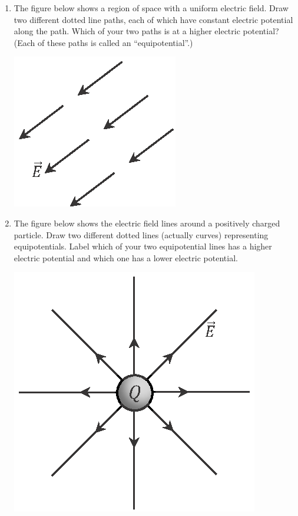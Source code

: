 \begin{enumerate}[wide, label=(\emph{\alph*})]
\item The figure below shows a region of space with a uniform electric field.  Draw two different dotted line paths, each of which have constant electric potential along the path.  Which of your two paths is at a higher electric potential?  (Each of these paths is called an ``equipotential''.)
\begin{center}
\vspace{-0.1 in}
\includegraphics{potential_intro/activity_5_figs/uniform_E_field_2_squish.eps}
\end{center}

\item The figure below shows the electric field lines around a positively charged particle.  Draw two different dotted lines (actually curves) representing equipotentials.  Label which of your two equipotential lines has a higher electric potential and which one has a lower electric potential. 
\begin{center}
\vspace{-0.1 in}
\includegraphics{potential_intro/activity_5_figs/point_charge_E_field.eps}
\end{center}


\end{enumerate}
